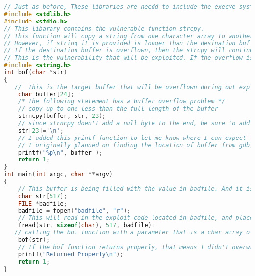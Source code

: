 \documentclass[14pt]{extarticle}
\begin{document}
\begin{lstlisting}[language=c]
// Just as before, These libraries are needd to include the execve system function
#include <stdlib.h>
#include <stdio.h>
// This libarary contains the vulnerable function strcpy.
// This function will copy a string from one character array to another, and it will only stop when it sees a null value.
// However, if string it is provided is longer than the desination buffer with no null values to end it, then the strcpy function will continue copying values from the source buffer into the destination, even if it overflows the destination buffer.
// If the destination buffer is overflown, then the strcpy will continue writing the source values directly onto the stack.
// This is the vulnerability that will be exploited. If the overflow is long enough, it will be possible to change the return address of the function. And if we place our own assembly code in the stack, I can set the return address to return to the exploit code.
#include <string.h>
int bof(char *str)
{
   //  This is the target buffer that will be overflown during out exploit
    char buffer[24];
    /* The following statement has a buffer overflow problem */
    // copy up to one less than the full length of the buffer
    strncpy(buffer, str, 23);
    // since strncpy doen't add a null byte to the end, be sure to add one here by hand.
    str[23]='\n';
    // I added this printf function to let me know where I can expect to find the start of the stack.
    // I originally planned on finding the location of buffer from gdb, but gdb adds in it's own acm
    printf("%p\n", buffer );
    return 1;
}
int main(int argc, char **argv)
{
    // This buffer is being filled with the value in badfile. And it is much larger than the buffer in bof.
    char str[517];
    FILE *badfile;
    badfile = fopen("badfile", "r");
    // This will read in the exploit code located in badfile, and place it  in the str variable. later this code will be placed on the stack in the bof function.
    fread(str, sizeof(char), 517, badfile);
   // calling the bof function with a parameter that is a char array of 517 bytes ( much larger than the 24 byte buffer in bof)
    bof(str);
    // If the bof function returns properly, that means I didn't overwrite the return address correctly. This will let me know that it returned to the main function.
    printf("Returned Properly\n");
    return 1;
}
\end{lstlisting}\cite{seed-bof}\\

\newpage


\end{document}
